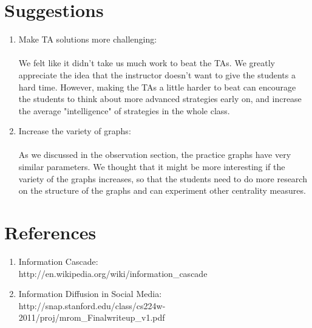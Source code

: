 \documentclass[12pt]{article}
\begin{document}
\section{Suggestions}
\begin{enumerate}
\item Make TA solutions more challenging: \\\\We felt like it didn't take us much work to beat the TAs.  We greatly appreciate the idea that the instructor doesn't want to give the students a hard time. However, making the TAs a little harder to beat can encourage the students to think about more advanced strategies early on, and increase the average "intelligence" of strategies in the whole class.   
\item Increase the variety of graphs: \\\\As we discussed in the observation section, the practice graphs have very similar parameters. We thought that it might be more interesting if the variety of the graphs increases, so that the students need to do more research on the structure of the graphs and can experiment other centrality measures. 
\end{enumerate}


\section{References}
\begin{enumerate}
\item Information Cascade:\\
 http://en.wikipedia.org/wiki/information\_cascade
\item Information Diffusion in Social Media: \\
 http://snap.stanford.edu/class/cs224w-2011/proj/mrom\_Finalwriteup\_v1.pdf

\end{enumerate}
\end{document}
